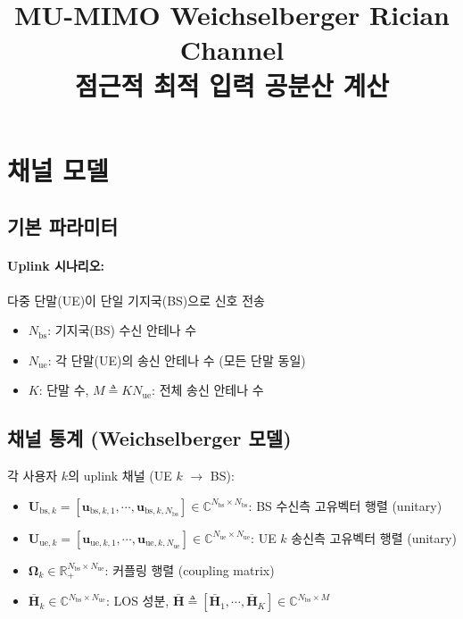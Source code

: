 \documentclass[10pt]{article}
\title{MU-MIMO Weichselberger Rician Channel\\
점근적 최적 입력 공분산 계산}
\author{}
\date{}
\begin{document}
\maketitle



\section{채널 모델}

\subsection{기본 파라미터}

\paragraph{Uplink 시나리오:} 다중 단말(UE)이 단일 기지국(BS)으로 신호 전송

\begin{itemize}
\item $N_{\text{bs}}$: 기지국(BS) 수신 안테나 수
\item $N_{\text{ue}}$: 각 단말(UE)의 송신 안테나 수 (모든 단말 동일)
\item $K$: 단말 수, $M \triangleq K N_{\text{ue}}$: 전체 송신 안테나 수
\end{itemize}

\subsection{채널 통계 (Weichselberger 모델)}

각 사용자 $k$의 uplink 채널 (UE $k$ $\to$ BS):

\begin{itemize}
\item $\mathbf{U}_{\text{bs},k} = [\mathbf{u}_{\text{bs},k,1}, \cdots, \mathbf{u}_{\text{bs},k,N_{\text{bs}}}] \in \mathbb{C}^{N_{\text{bs}} \times N_{\text{bs}}}$: BS 수신측 고유벡터 행렬 (unitary)
\item $\mathbf{U}_{\text{ue},k} = [\mathbf{u}_{\text{ue},k,1}, \cdots, \mathbf{u}_{\text{ue},k,N_{\text{ue}}}] \in \mathbb{C}^{N_{\text{ue}} \times N_{\text{ue}}}$: UE $k$ 송신측 고유벡터 행렬 (unitary)
\item $\boldsymbol{\Omega}_k \in \mathbb{R}_+^{N_{\text{bs}} \times N_{\text{ue}}}$: 커플링 행렬 (coupling matrix)
\item $\bar{\mathbf{H}}_k \in \mathbb{C}^{N_{\text{bs}} \times N_{\text{ue}}}$: LOS 성분, $\bar{\mathbf{H}} \triangleq [\bar{\mathbf{H}}_1, \cdots, \bar{\mathbf{H}}_K] \in \mathbb{C}^{N_{\text{bs}} \times M}$
\end{itemize}
\end{document}
